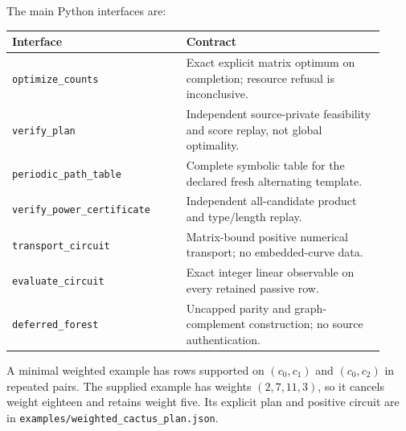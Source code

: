 \documentclass[11pt,letterpaper]{article}
\theoremstyle{definition}
\theoremstyle{remark}
\newcommand{\code}[1]{\texttt{\small #1}}
\begin{document}
The main Python interfaces are:
\begin{center}
\begin{tabular}{>{\raggedright\arraybackslash}p{0.43\linewidth}>{\raggedright\arraybackslash}p{0.49\linewidth}}
\toprule
Interface & Contract \\
\midrule
\code{optimize\_counts} & Exact explicit matrix optimum on completion; resource refusal is inconclusive. \\
\code{verify\_plan} & Independent source-private feasibility and score replay, not global optimality. \\
\code{periodic\_path\_table} & Complete symbolic table for the declared fresh alternating template. \\
\code{verify\_power\_certificate} & Independent all-candidate product and type/length replay. \\
\code{transport\_circuit} & Matrix-bound positive numerical transport; no embedded-curve data. \\
\code{evaluate\_circuit} & Exact integer linear observable on every retained passive row. \\
\code{deferred\_forest} & Uncapped parity and graph-complement construction; no source authentication. \\
\bottomrule
\end{tabular}
\end{center}

A minimal weighted example has rows supported on $(c_0,c_1)$ and $(c_0,c_2)$ in repeated pairs. The supplied example has weights $(2,7,11,3)$, so it cancels weight eighteen and retains weight five. Its explicit plan and positive circuit are in \code{examples/weighted\_cactus\_plan.json}.
\end{document}
